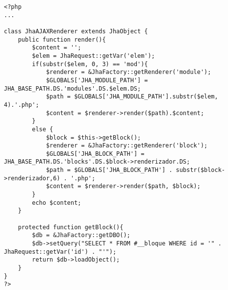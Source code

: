\begin{lstlisting}[label=jha_renderer_head,caption=Renderizador para el tag HTML `head'.]
<?php
...

class JhaAJAXRenderer extends JhaObject {
    public function render(){
        $content = '';
        $elem = JhaRequest::getVar('elem');
        if(substr($elem, 0, 3) == 'mod'){
        	$renderer = &JhaFactory::getRenderer('module');
        	$GLOBALS['JHA_MODULE_PATH'] = JHA_BASE_PATH.DS.'modules'.DS.$elem.DS;
            $path = $GLOBALS['JHA_MODULE_PATH'].substr($elem, 4).'.php';
            $content = $renderer->render($path).$content;
        }
        else {
        	$block = $this->getBlock();
        	$renderer = &JhaFactory::getRenderer('block');
        	$GLOBALS['JHA_BLOCK_PATH'] = JHA_BASE_PATH.DS.'blocks'.DS.$block->renderizador.DS;
            $path = $GLOBALS['JHA_BLOCK_PATH'] . substr($block->renderizador,6) . '.php';
            $content = $renderer->render($path, $block);
        }
        echo $content;
    }
    
    protected function getBlock(){
    	$db = &JhaFactory::getDBO();
        $db->setQuery("SELECT * FROM #__bloque WHERE id = '" . JhaRequest::getVar('id') . "'");
        return $db->loadObject();
    }
}
?>
\end{lstlisting}
